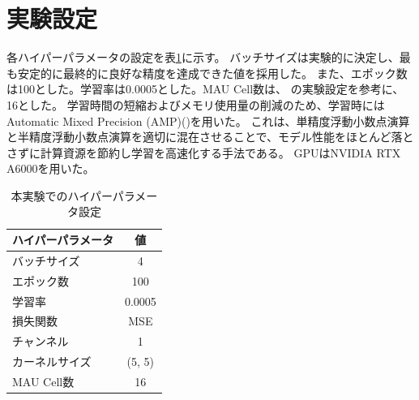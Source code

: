   \section{実験設定}
    各ハイパーパラメータの設定を表\ref{tab:exp1_hyperparameters}に示す。
    バッチサイズは実験的に決定し、最も安定的に最終的に良好な精度を達成できた値を採用した。
    また、エポック数は100とした。学習率は0.0005とした。MAU Cell数は、 \cite{chang2021mau} の実験設定を参考に、16とした。
    学習時間の短縮およびメモリ使用量の削減のため、学習時にはAutomatic Mixed Precision (AMP)(\cite{micikevicius2017mixed})を用いた。
    これは、単精度浮動小数点演算と半精度浮動小数点演算を適切に混在させることで、モデル性能をほとんど落とさずに計算資源を節約し学習を高速化する手法である。
    GPUはNVIDIA RTX A6000を用いた。
    \begin{table}[htbp]
      \centering
      \begin{tabular}{lc}
      \hline
      ハイパーパラメータ & 値 \\
      \hline\hline
      バッチサイズ & 4 \\
      \hline
      エポック数 & 100 \\
      \hline
      学習率 & 0.0005 \\
      \hline
      損失関数 & MSE \\
      \hline
      チャンネル & 1 \\
      \hline
      カーネルサイズ & (5, 5) \\
      \hline
      MAU Cell数 & 16 \\
      \hline
      \end{tabular}
      \caption{本実験でのハイパーパラメータ設定}
      \label{tab:exp1_hyperparameters}
    \end{table}


